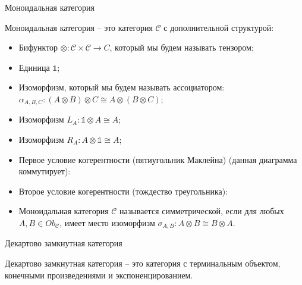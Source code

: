 \begin{defin} Моноидальная категория

  Моноидальная категория -- это категория $\mathcal{C}$ с дополнительной структурой:
  \begin{itemize}
    \item Бифунктор $\otimes : \mathcal{C} \times \mathcal{C} \to C$, который мы будем называть тензором;
    \item Единица $\mathds{1}$;
    \item Изоморфизм, который мы будем называть ассоциатором: $\alpha_{A,B,C}: (A \otimes B) \otimes C \cong A \otimes (B \otimes C)$;
    \item Изоморфизм  $L_A : \mathds{1} \otimes A \cong A$;
    \item Изоморфизм $R_A : A \otimes \mathds{1} \cong A$;
    \item Первое условие когерентности (пятиугольник Маклейна) (данная диаграмма коммутирует):

    \item Второе условие когерентности (тождество треугольника):


    \item Моноидальная категория $\mathcal{C}$ называется симметрической, если для любых $A,B \in Ob_{\mathcal{C}}$, имеет место изоморфизм $\sigma_{A,B} : A \otimes B \cong B \otimes A$.
  \end{itemize}
\end{defin}

\begin{defin} Декартово замкнутная категория

  Декартово замкнутная категория -- это категория с терминальным объектом, конечными произведениями и экспоненцированием.
\end{defin}

